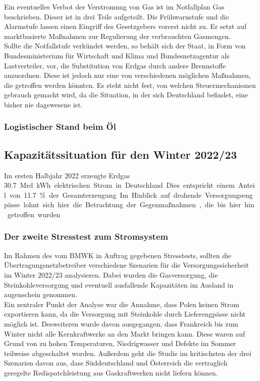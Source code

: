 		Ein eventuelles Verbot der Verstromung von Gas ist im Notfallplan Gas beschrieben. Dieser ist in drei Teile aufgeteilt. Die Frühwarnstufe und die Alarmstufe lassen einen Eingriff des Gesetzgebers vorerst nicht zu. Er setzt auf marktbasierte Maßnahmen zur Regulierung der verbrauchten Gasmengen. \\
		
		Sollte die Notfallstufe verkündet werden, so behält sich der Staat, in Form von Bundesministerium für Wirtschaft und Klima und Bundesnetzagentur als Lastverteiler, vor, die Substitution von Erdgas durch andere Brennstoffe anzuordnen. Diese ist jedoch nur eine von verschiedenen möglichen Maßnahmen, die getroffen werden könnten. Es steht nicht fest, von welchen Steuermechanismen gebrauch gemacht wird, da die Situation, in der sich Deutschland befindet, eine bisher nie dagewesene ist. 
		
		\subsubsection{Logistischer Stand beim Öl}
		
	
	
	\subsection{Kapazitätssituation für den Winter 2022/23}
	Im ersten Halbjahr 2022 erzeugte Erdgas \SI{30,7} Mrd. {kWh} elektrischen Strom in Deutschland. Dies entspricht einem Anteil von \SI{11,7}{\percent} der Gesamterzeugung. Im Hinblick auf drohende Versorgungsengpässe lohnt sich hier die Betrachtung der Gegenmaßnahmen, die bis hier hin getroffen wurden. \\
	
		\subsubsection{Der zweite Stresstest zum Stromsystem}
		Im Rahmen des vom BMWK in Auftrag gegebenen Stresstests, sollten die Übertragungsnetzbetreiber verschiedene Szenarien für die Versorgungssicherheit im Winter 2022/23 analysieren. Dabei wurden die Gasversorgung, die Steinkohleversorgung und eventuell ausfallende Kapazitäten im Ausland in augenschein genommen.\\
		
		Ein zentraler Punkt der Analyse war die Annahme, dass Polen keinen Strom exportieren kann, da die Versorgung mit Steinkohle durch Lieferengpässe nicht möglich ist. Desweiteren wurde davon ausgegangen, dass Frankreich bis zum Winter nicht alle Kernkraftwerke an den Markt bringen kann. Diese waren auf Grund von zu hohen Temperaturen, Niedrigwasser und Defekte im Sommer teilweise abgeschaltet worden. Außerdem geht die Studie im kritischsten der drei Szenarien davon aus, dass Süddeutschland und Österreich die vertraglich geregelte Redispatchleistung aus Gaskraftwerken nicht liefern können. \\
		
